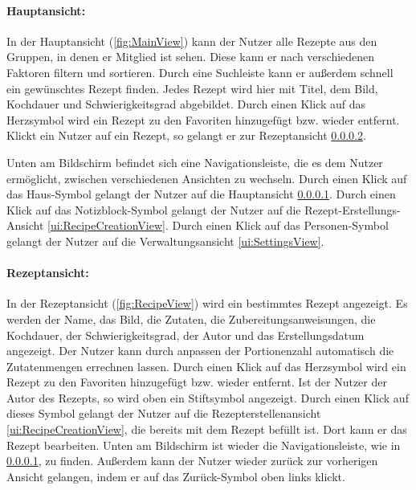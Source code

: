 \documentclass[parskip=full]{scrartcl}
\begin{document}
\paragraph{Hauptansicht:}
\label{ui:MainView}
In der Hauptansicht (\autoref{fig:MainView}) kann der Nutzer alle Rezepte aus den Gruppen, in denen er Mitglied ist sehen. Diese kann er nach verschiedenen Faktoren filtern und sortieren. Durch eine Suchleiste kann er außerdem schnell ein gewünschtes Rezept finden. Jedes Rezept wird hier mit Titel, dem Bild, Kochdauer und Schwierigkeitsgrad abgebildet. Durch einen Klick auf das Herzsymbol wird ein Rezept zu den Favoriten hinzugefügt bzw. wieder entfernt. Klickt ein Nutzer auf ein Rezept, so gelangt er zur Rezeptansicht \ref{ui:RecipeView}.

Unten am Bildschirm befindet sich eine Navigationsleiste, die es dem Nutzer ermöglicht, zwischen verschiedenen Ansichten zu wechseln. Durch einen Klick auf das Haus-Symbol gelangt der Nutzer auf die Hauptansicht \ref{ui:MainView}. Durch einen Klick auf das Notizblock-Symbol gelangt der Nutzer auf die Rezept-Erstellungs-Ansicht \ref{ui:RecipeCreationView}. Durch einen Klick auf das Personen-Symbol gelangt der Nutzer auf die Verwaltungsansicht \ref{ui:SettingsView}.

\paragraph{Rezeptansicht:}
\label{ui:RecipeView}
In der Rezeptansicht (\autoref{fig:RecipeView}) wird ein bestimmtes Rezept angezeigt. Es werden der Name, das Bild, die Zutaten, die Zubereitungsanweisungen, die Kochdauer, der Schwierigkeitsgrad, der Autor und das Erstellungsdatum angezeigt. Der Nutzer kann durch anpassen der Portionenzahl automatisch die Zutatenmengen errechnen lassen. Durch einen Klick auf das Herzsymbol wird ein Rezept zu den Favoriten hinzugefügt bzw. wieder entfernt. Ist der Nutzer der Autor des Rezepts, so wird oben ein Stiftsymbol angezeigt. Durch einen Klick auf dieses Symbol gelangt der Nutzer auf die Rezepterstellenansicht \ref{ui:RecipeCreationView}, die bereits mit dem Rezept befüllt ist. Dort kann er das Rezept bearbeiten. Unten am Bildschirm ist wieder die Navigationsleiste, wie in \ref{ui:MainView}, zu finden. Außerdem kann der Nutzer wieder zurück zur vorherigen Ansicht gelangen, indem er auf das Zurück-Symbol oben links klickt.
\end{document}
